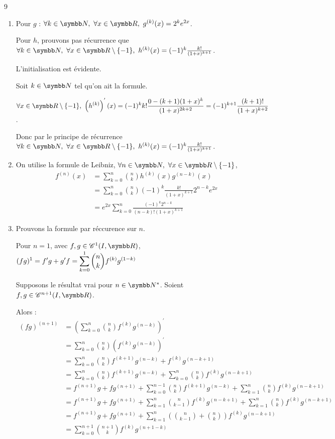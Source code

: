\begin{correction}{9}
\begin{enumerate}
    \item Pour $g$ : $\forall k \in \N,~\forall x \in \R,~g^{(k)}(x) = 2^k e^{2x}$.

    Pour $h$, prouvons pas récurrence que
    $\forall k \in \N,~\forall x \in \R \setminus \{-1\},~h^{(k)}(x) = (-1)^k \frac {k!} {(1+x)^{k+1}}$.

    L'initialisation est évidente.

    Soit $k \in \N$ tel qu'on ait la formule.

    $\ds \forall x \in \R \setminus \{-1\},~ \left(h^{(k)}\right)^{'}(x) = (-1)^k k! \frac {0 - (k + 1)(1+x)^k} {(1+x)^{2k+2}} = (-1)^{k+1} \frac {(k+1)!} {(1+x)^{k+2}}$.

    Donc par le principe de récurrence
    $\forall k \in \N,~\forall x \in \R \setminus \{-1\},~h^{(k)}(x) = (-1)^k \frac {k!} {(1+x)^{k+1}}$.

    \item On utilise la formule de Leibniz, $\forall n \in \N,~\forall x \in \R \setminus \{-1\}$,
    \begin{align*}
        f^{(n)}(x) &= \sum_{k=0}^n \binom n k h^{(k)}(x)g^{(n-k)}(x) \\
        &= \sum_{k=0}^n \binom n k (-1)^k \frac {k!} {(1+x)^{k+1}} 2^{n-k} e^{2x} \\
        &= e^{2x} \sum_{k=0}^n \frac {(-1)^k 2^{n-k}} {(n-k)!(1+x)^{k+1}}
    \end{align*}

    \item Prouvons la formule par réccurence sur $n$.

    Pour $n = 1$, avec $f,g \in \mathscr C^1(I,\R)$, $\displaystyle (fg)^1 = f'g + g'f = \sum_{k=0}^1 \binom n k f^{(k)} g^{(1 - k)}$

    Supposons le résultat vrai pour $n \in \N^*$.
    Soient $f,g \in \mathscr C^{n+1}(I,\R)$. 

    Alors :
    {\allowdisplaybreaks
    \begin{align*}
        (fg)^{(n+1)} &= \left(\sum_{k=0}^n \binom n k f^{(k)} g^{(n-k)}\right)^{'} \\
        &= \sum_{k=0}^n \binom n k \left(f^{(k)}g^{(n-k)}\right)^{'} \\
        &= \sum_{k=0}^n \binom n k f^{(k+1)}g^{(n-k)} + f^{(k)}g^{(n-k+1)} \\
        &= \sum_{k=0}^n \binom n k f^{(k+1)}g^{(n-k)} + \sum_{k=0}^n \binom n k f^{(k)}g^{(n-k+1)} \\
        &= f^{(n+1)}g + fg^{(n+1)} + \sum_{k=0}^{n-1} \binom n k f^{(k+1)}g^{(n-k)} + \sum_{k=1}^n \binom n k f^{(k)}g^{(n-k+1)} \\
        &= f^{(n+1)}g + fg^{(n+1)} + \sum_{k=1}^{n} \binom n {k-1} f^{(k)}g^{(n-k+1)} + \sum_{k=1}^n \binom n k f^{(k)}g^{(n-k+1)} \\       
        &= f^{(n+1)}g + fg^{(n+1)} + \sum_{k=1}^{n} \left(\binom n {k-1}+ \binom n k\right) f^{(k)}g^{(n-k+1)} \\      
        &= \sum_{k=0}^{n+1} \binom {n+1} k f^{(k)}g^{(n+1-k)}       
    \end{align*}
    }


\end{enumerate}
\end{correction}
